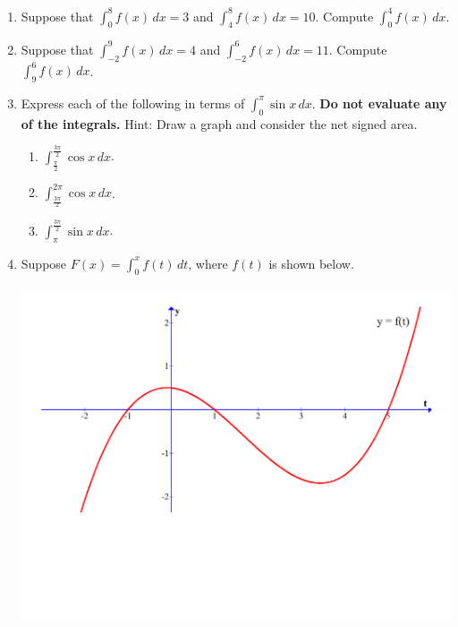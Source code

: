 \documentclass[12pt]{article}
\newif\ifans
\begin{document}
\begin{enumerate}
\ifans{\fbox{$-26$}} \fi

\item Suppose that $\int_0^8{f(x)} \,dx=3$ and $\int_4^{8}{f(x)} \,dx=10$.  Compute $\int_0^4{f(x)} \,dx$.

\ifans{\fbox{$-7$}} \fi

\item Suppose that $\int_{-2}^9{f(x)} \,dx=4$ and $\int_{-2}^{6}{f(x)} \,dx=11$.  Compute $\int_{9}^6{f(x)} \,dx$.

\ifans{\fbox{$7$; Video Solution: \textcolor{blue}{\href{https://www.youtube.com/watch?v=IBZspjDFQmY}{https://www.youtube.com/watch?v=IBZspjDFQmY}}}} \fi

\item Express each of the following in terms of $\int_0^{\pi}\sin{x} \,dx$.  {\bf Do not evaluate any of the integrals.}  Hint: Draw a graph and consider the net signed area.

\begin{enumerate}

\item $\int_{\frac{\pi}{2}}^{\frac{3\pi}{2}}\cos{x} \,dx$.

\ifans{\fbox{$\int_{\frac{\pi}{2}}^{\frac{3\pi}{2}}\cos{x} \,dx=-\int_0^{\pi}\sin{x} \,dx$}} \fi

\item $\int_{\frac{3\pi}{2}}^{2\pi}\cos{x} \,dx$.

\ifans{\fbox{$\int_{\frac{3\pi}{2}}^{2\pi}\cos{x} \,dx=\frac{1}{2}\int_0^{\pi}\sin{x} \,dx$}} \fi

\item $\int_{\pi}^{\frac{3\pi}{2}}\sin{x} \,dx$.

\ifans{\fbox{$\int_{\pi}^{\frac{3\pi}{2}}\sin{x} \,dx=-\frac{1}{2}\int_0^{\pi}\sin{x} \,dx$}} \fi

\end{enumerate}

\item Suppose $F(x)=\int_0^x{f(t)} \,dt$, where $f(t)$ is shown below.

\hspace{2cm} \includegraphics[scale=0.4]{graph2.pdf}


\end{enumerate}
\end{document}
